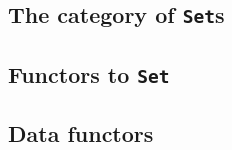 \documentclass{amsart}
\newcommand{\type}[1]{{\tt #1}}
\begin{document}
\subsection{The category of \type{Set}s}

\subsection{Functors to \type{Set}}
\label{sec:functorstoset}

\subsection{Data functors}
\label{sec:datafunctors}
\end{document}
